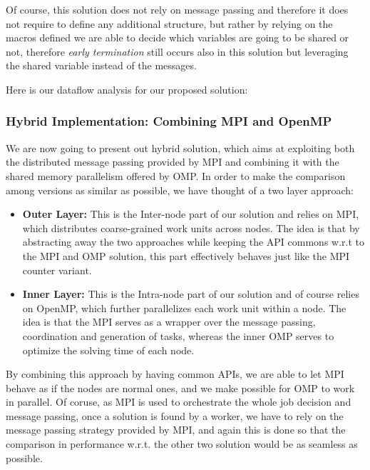 Of course, this solution does not rely on message passing and therefore it does not require to define any additional structure, but rather by relying on the macros defined we are able to decide which variables are going to be shared or not, therefore \textit{early termination} still occurs also in this solution but leveraging the shared variable instead of the messages. 

Here is our dataflow analysis for our proposed solution:

\subsubsection{Hybrid Implementation: Combining MPI and OpenMP}
\label{subsubsec:hybrid_implementation}

We are now going to present out hybrid solution, which aims at exploiting both the distributed message passing provided by MPI and combining it with the shared memory parallelism offered by OMP. In order to make the comparison among versions as similar as possible, we have thought of a two layer approach:
\begin{itemize}
    \item \textbf{Outer Layer:} This is the Inter-node part of our solution and relies on MPI, which distributes coarse-grained work units across nodes. The idea is that by abstracting away the two approaches while keeping the API commons w.r.t to the MPI and OMP solution, this part effectively behaves just like the MPI counter variant.
    \item \textbf{Inner Layer:} This is the Intra-node part of our solution and of course relies on OpenMP, which further parallelizes each work unit within a node. The idea is that the MPI serves as a wrapper over the message passing, coordination and generation of tasks, whereas the inner OMP serves to optimize the solving time of each node.
\end{itemize}


By combining this approach by having common APIs, we are able to let MPI behave as if the nodes are normal ones, and we make possible for OMP to work in parallel. Of coruse, as MPI is used to orchestrate the whole job decision and message passing, once a solution is found by a worker, we have to rely on the message passing strategy provided by MPI, and again this is done so that the comparison in performance w.r.t. the other two solution would be as seamless as possible.


